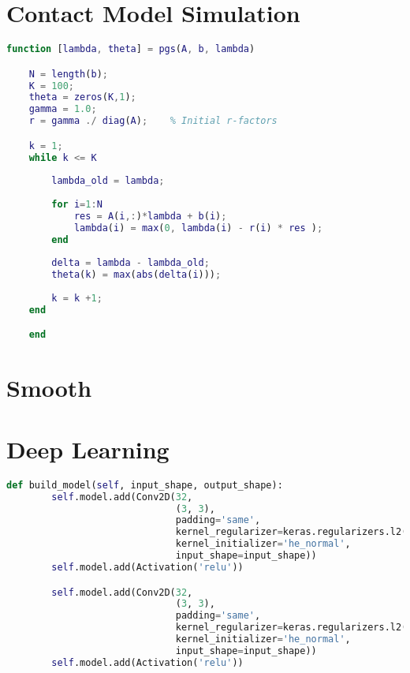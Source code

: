\begin{appendices}
\renewcommand{\thechapter}{\Alph{chapter}.}
\chapter{Contact Model Simulation}
\begin{lstlisting}[language=Matlab]
    function [lambda, theta] = pgs(A, b, lambda)

    N = length(b);
    K = 100;
    theta = zeros(K,1);
    gamma = 1.0;
    r = gamma ./ diag(A);    % Initial r-factors

    k = 1;
    while k <= K
    
        lambda_old = lambda;
        
        for i=1:N         
            res = A(i,:)*lambda + b(i);
            lambda(i) = max(0, lambda(i) - r(i) * res );
        end
    
        delta = lambda - lambda_old;
        theta(k) = max(abs(delta(i)));
    
        k = k +1; 
    end

    end

\end{lstlisting}
\chapter{Smooth}

\chapter{Deep Learning}

\begin{lstlisting}[language=python]
    def build_model(self, input_shape, output_shape):
        self.model.add(Conv2D(32,
                              (3, 3),
                              padding='same',
                              kernel_regularizer=keras.regularizers.l2(self.weight_decay),
                              kernel_initializer='he_normal',
                              input_shape=input_shape))
        self.model.add(Activation('relu'))

        self.model.add(Conv2D(32,
                              (3, 3),
                              padding='same',
                              kernel_regularizer=keras.regularizers.l2(self.weight_decay),
                              kernel_initializer='he_normal',
                              input_shape=input_shape))
        self.model.add(Activation('relu'))


\end{lstlisting}
\end{appendices}
